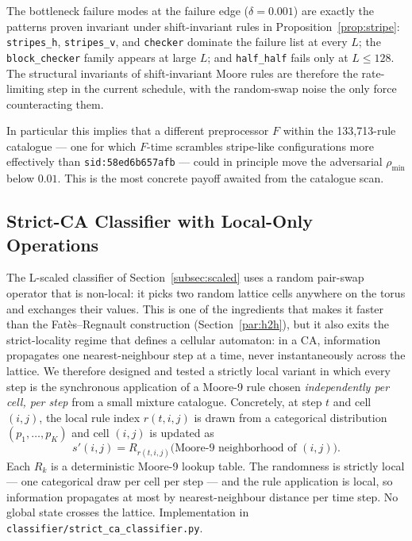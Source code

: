 \documentclass[11pt,a4paper]{article}
\newcommand{\sid}[1]{\texttt{sid:}\allowbreak\texttt{#1}}
\newcommand{\fpath}[1]{\nolinkurl{#1}}
\begin{document}
The bottleneck failure modes at the failure edge (\(\delta=0.001\)) are
exactly the patterns proven invariant under shift-invariant rules in
Proposition~\ref{prop:stripe}: \texttt{stripes\_h}, \texttt{stripes\_v},
and \texttt{checker} dominate the failure list at every \(L\); the
\texttt{block\_checker} family appears at large \(L\); and
\texttt{half\_half} fails only at \(L\leq 128\).  The structural
invariants of shift-invariant Moore rules are therefore the rate-limiting
step in the current schedule, with the random-swap noise the only force
counteracting them.

In particular this implies that a different preprocessor \(F\) within the
133{,}713-rule catalogue --- one for which \(F\)-time scrambles
stripe-like configurations more effectively than \sid{58ed6b657afb} ---
could in principle move the adversarial \(\rho_{\min}\) below \(0.01\).
This is the most concrete payoff awaited from the catalogue scan.

\subsection{Strict-CA Classifier with Local-Only Operations}
\label{subsec:strict-ca}

The L-scaled classifier of Section~\ref{subsec:scaled} uses a random
pair-swap operator that is non-local: it picks two random lattice cells
anywhere on the torus and exchanges their values.  This is one of the
ingredients that makes it faster than the Fat\`{e}s--Regnault construction
(Section~\ref{par:h2h}), but it also exits the strict-locality regime
that defines a cellular automaton: in a CA, information propagates one
nearest-neighbour step at a time, never instantaneously across the
lattice.  We therefore designed and tested a strictly local variant in
which every step is the synchronous application of a Moore-9 rule chosen
\emph{independently per cell, per step} from a small mixture catalogue.
Concretely, at step \(t\) and cell \((i, j)\), the local rule index
\(r(t, i, j)\) is drawn from a categorical distribution \((p_1, \ldots,
p_K)\) and cell \((i, j)\) is updated as
\[
s'(i, j) = R_{r(t, i, j)}\bigl(\text{Moore-9 neighborhood of }(i, j)\bigr).
\]
Each \(R_k\) is a deterministic Moore-9 lookup table.  The randomness is
strictly local --- one categorical draw per cell per step --- and the
rule application is local, so information propagates at most by
nearest-neighbour distance per time step.  No global state crosses the
lattice.  Implementation in \fpath{classifier/strict_ca_classifier.py}.
\end{document}
